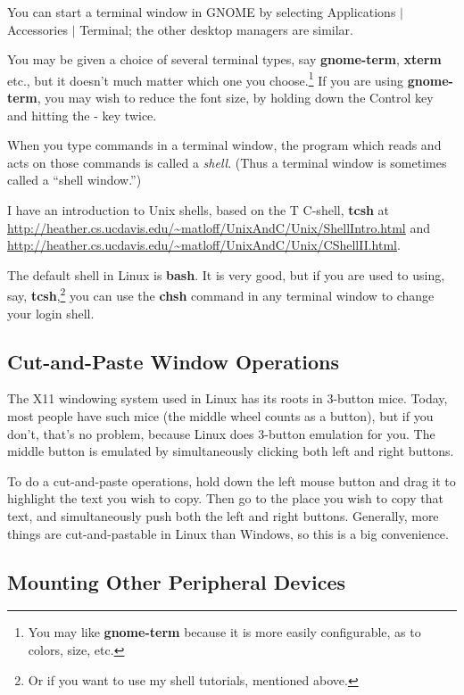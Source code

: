 \documentclass[11pt]{article}
\begin{document}
You can start a terminal window in GNOME by selecting Applications $|$
Accessories $|$ Terminal; the other desktop managers are similar.

You may be given a choice of several terminal types, say {\bf
gnome-term}, {\bf xterm} etc., but it doesn't much matter which one you
choose.\footnote{You may like {\bf gnome-term} because it is more easily
configurable, as to colors, size, etc.}  If you are using {\bf
gnome-term}, you may wish to reduce the font size, by holding down the
Control key and hitting the - key twice.

When you type commands in a terminal window, the program which reads and
acts on those commands is called a {\it shell}.  (Thus a terminal window
is sometimes called a ``shell window.'')

I have an introduction to Unix shells, based on the T C-shell, {\bf tcsh}
at \url{http://heather.cs.ucdavis.edu/~matloff/UnixAndC/Unix/ShellIntro.html}
and \url{http://heather.cs.ucdavis.edu/~matloff/UnixAndC/Unix/CShellII.html}.

The default shell in Linux is {\bf bash}. It is very good, but if you
are used to using, say, {\bf tcsh},\footnote{Or if you want to use my
shell tutorials, mentioned above.} you can use the {\bf chsh} command in
any terminal window to change your login shell.

\subsection{Cut-and-Paste Window Operations}

The X11 windowing system used in Linux has its roots in 3-button mice.
Today, most people have such mice (the middle wheel counts as a button),
but if you don't, that's no problem, because Linux does 3-button
emulation for you.  The middle button is emulated by simultaneously
clicking both left and right buttons.

To do a cut-and-paste operations, hold down the left mouse button and
drag it to highlight the text you wish to copy.  Then go to the place
you wish to copy that text, and simultaneously push both the left and
right buttons.  Generally, more things are cut-and-pastable in Linux
than Windows, so this is a big convenience.

\subsection{Mounting Other Peripheral Devices}
\end{document}
